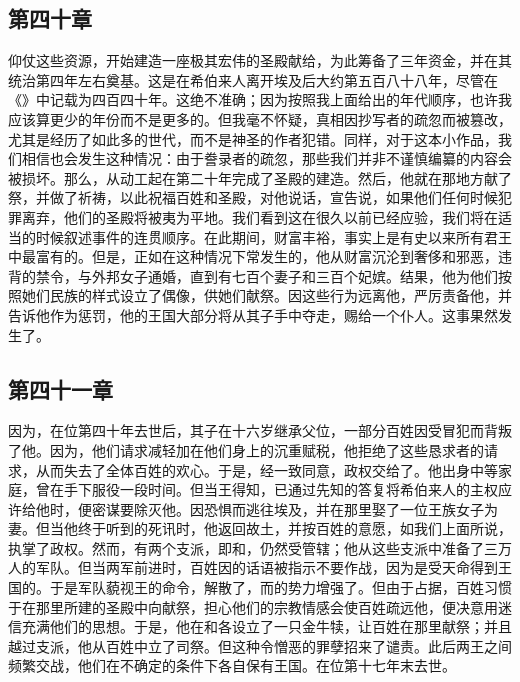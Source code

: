 
\subsection{第四十章}

仰仗这些资源，开始建造一座极其宏伟的圣殿献给，为此筹备了三年资金，并在其统治第四年左右奠基。这是在希伯来人离开埃及后大约第五百八十八年，尽管在《》中记载为四百四十年。这绝不准确；因为按照我上面给出的年代顺序，也许我应该算更少的年份而不是更多的。但我毫不怀疑，真相因抄写者的疏忽而被篡改，尤其是经历了如此多的世代，而不是神圣的作者犯错。同样，对于这本小作品，我们相信也会发生这种情况：由于誊录者的疏忽，那些我们并非不谨慎编纂的内容会被损坏。那么，从动工起在第二十年完成了圣殿的建造。然后，他就在那地方献了祭，并做了祈祷，以此祝福百姓和圣殿，对他说话，宣告说，如果他们任何时候犯罪离弃，他们的圣殿将被夷为平地。我们看到这在很久以前已经应验，我们将在适当的时候叙述事件的连贯顺序。在此期间，财富丰裕，事实上是有史以来所有君王中最富有的。但是，正如在这种情况下常发生的，他从财富沉沦到奢侈和邪恶，违背的禁令，与外邦女子通婚，直到有七百个妻子和三百个妃嫔。结果，他为他们按照她们民族的样式设立了偶像，供她们献祭。因这些行为远离他，严厉责备他，并告诉他作为惩罚，他的王国大部分将从其子手中夺走，赐给一个仆人。这事果然发生了。\par


\subsection{第四十一章}

因为，在位第四十年去世后，其子在十六岁继承父位，一部分百姓因受冒犯而背叛了他。因为，他们请求减轻加在他们身上的沉重赋税，他拒绝了这些恳求者的请求，从而失去了全体百姓的欢心。于是，经一致同意，政权交给了。他出身中等家庭，曾在手下服役一段时间。但当王得知，已通过先知的答复将希伯来人的主权应许给他时，便密谋要除灭他。因恐惧而逃往埃及，并在那里娶了一位王族女子为妻。但当他终于听到的死讯时，他返回故土，并按百姓的意愿，如我们上面所说，执掌了政权。然而，有两个支派，即和，仍然受管辖；他从这些支派中准备了三万人的军队。但当两军前进时，百姓因的话语被指示不要作战，因为是受天命得到王国的。于是军队藐视王的命令，解散了，而的势力增强了。但由于占据，百姓习惯于在那里所建的圣殿中向献祭，担心他们的宗教情感会使百姓疏远他，便决意用迷信充满他们的思想。于是，他在和各设立了一只金牛犊，让百姓在那里献祭；并且越过支派，他从百姓中立了司祭。但这种令憎恶的罪孽招来了谴责。此后两王之间频繁交战，他们在不确定的条件下各自保有王国。在位第十七年末去世。\par

